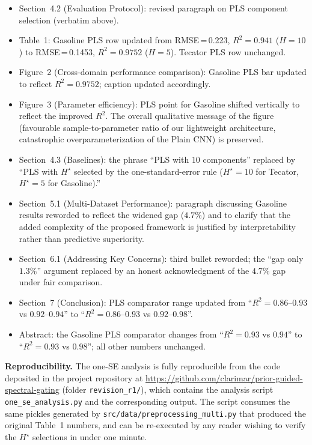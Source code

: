 \documentclass[11pt,a4paper]{article}
\begin{document}
\begin{itemize}
  \setlength\itemsep{0.15em}
  \item Section~4.2 (Evaluation Protocol): revised paragraph on PLS
        component selection (verbatim above).
  \item Table~1: Gasoline PLS row updated from
        RMSE\,=\,0.223, $R^{2}=0.941$ ($H=10$) to
        RMSE\,=\,0.1453, $R^{2}=0.9752$ ($H=5$). Tecator PLS row
        unchanged.
  \item Figure~2 (Cross-domain performance comparison): Gasoline PLS
        bar updated to reflect $R^{2}=0.9752$; caption updated
        accordingly.
  \item Figure~3 (Parameter efficiency): PLS point for Gasoline shifted
        vertically to reflect the improved $R^{2}$. The overall
        qualitative message of the figure (favourable
        sample-to-parameter ratio of our lightweight architecture,
        catastrophic overparameterization of the Plain CNN) is
        preserved.
  \item Section~4.3 (Baselines): the phrase ``PLS with $10$
        components'' replaced by ``PLS with $H^{\star}$ selected by the
        one-standard-error rule ($H^{\star}=10$ for Tecator,
        $H^{\star}=5$ for Gasoline).''
  \item Section~5.1 (Multi-Dataset Performance): paragraph discussing
        Gasoline results reworded to reflect the widened gap
        ($4.7\%$) and to clarify that the added complexity of the
        proposed framework is justified by interpretability rather
        than predictive superiority.
  \item Section~6.1 (Addressing Key Concerns): third bullet
        reworded; the ``gap only $1.3\%$'' argument replaced by an
        honest acknowledgment of the $4.7\%$ gap under fair comparison.
  \item Section~7 (Conclusion): PLS comparator range updated from
        ``$R^{2}=0.86$--$0.93$ vs $0.92$--$0.94$'' to
        ``$R^{2}=0.86$--$0.93$ vs $0.92$--$0.98$''.
  \item Abstract: the Gasoline PLS comparator changes from
        ``$R^{2}=0.93$ vs $0.94$'' to ``$R^{2}=0.93$ vs $0.98$'';
        all other numbers unchanged.
\end{itemize}

\bigskip
\noindent\textbf{Reproducibility.}
The one-SE analysis is fully reproducible from the code deposited in
the project repository at
\url{https://github.com/clarimar/prior-guided-spectral-gating} (folder
\texttt{revision\_r1/}), which contains the analysis script
\texttt{one\_se\_analysis.py} and the corresponding output. The script
consumes the same pickles generated by
\texttt{src/data/preprocessing\_multi.py} that produced the original
Table~1 numbers, and can be re-executed by any reader wishing to verify
the $H^{\star}$ selections in under one minute.
\end{document}
